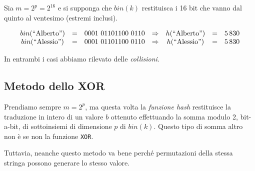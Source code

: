 \begin{eg}
    Sia $m=2^p=2^{16}$ e si supponga che $bin(k)$ restituisca i 16 bit che vanno
    dal quinto al ventesimo (estremi inclusi).

    \[\begin{array}[t]{ccccccc}
        bin(\text{``Alberto''}) & = & 0001\ 01101100\ 0110 & \Rightarrow &
        h(\text{``Alberto''}) & = & 5\,830\\
        bin(\text{``Alessio''}) & = & 0001\ 01101100\ 0110 & \Rightarrow &
        h(\text{``Alessio''}) & = & 5\,830
    \end{array}\]
\end{eg}\noindent
In entrambi i casi abbiamo rilevato delle \emph{collisioni}.

\subsection{Metodo dello XOR}
Prendiamo sempre $m=2^p$, ma questa volta la \emph{funzione hash} restituisce la
traduzione in intero di un valore $b$ ottenuto effettuando la somma modulo 2,
bit-a-bit, di sottoinsiemi di dimensione $p$ di $bin(k)$. Questo tipo di somma
altro non è se non la funzione \texttt{XOR}.

Tuttavia, neanche questo metodo va bene perché permutazioni della stessa stringa
possono generare lo stesso valore.

